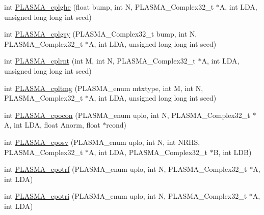 \begin{DoxyCompactItemize}
\item 
int \hyperlink{group__PLASMA__Complex32__t_gab2e8cb228186ddf8555009ee5b678b1c_gab2e8cb228186ddf8555009ee5b678b1c}{P\+L\+A\+S\+M\+A\+\_\+cplghe} (float bump, int N, P\+L\+A\+S\+M\+A\+\_\+\+Complex32\+\_\+t $\ast$A, int L\+D\+A, unsigned long long int seed)
\item 
int \hyperlink{group__PLASMA__Complex32__t_ga3fc244eb71f8484ede01d0a8fb8b7243_ga3fc244eb71f8484ede01d0a8fb8b7243}{P\+L\+A\+S\+M\+A\+\_\+cplgsy} (P\+L\+A\+S\+M\+A\+\_\+\+Complex32\+\_\+t bump, int N, P\+L\+A\+S\+M\+A\+\_\+\+Complex32\+\_\+t $\ast$A, int L\+D\+A, unsigned long long int seed)
\item 
int \hyperlink{group__PLASMA__Complex32__t_gadc1ab86fbc4e1acd67411bcf7d18ccc1_gadc1ab86fbc4e1acd67411bcf7d18ccc1}{P\+L\+A\+S\+M\+A\+\_\+cplrnt} (int M, int N, P\+L\+A\+S\+M\+A\+\_\+\+Complex32\+\_\+t $\ast$A, int L\+D\+A, unsigned long long int seed)
\item 
int \hyperlink{group__PLASMA__Complex32__t_gae69ed47baf0586751c50c701b1bba434_gae69ed47baf0586751c50c701b1bba434}{P\+L\+A\+S\+M\+A\+\_\+cpltmg} (P\+L\+A\+S\+M\+A\+\_\+enum mtxtype, int M, int N, P\+L\+A\+S\+M\+A\+\_\+\+Complex32\+\_\+t $\ast$A, int L\+D\+A, unsigned long long int seed)
\item 
int \hyperlink{group__PLASMA__Complex32__t_ga49718ad20a5a6701a7f3f91dc64173ba_ga49718ad20a5a6701a7f3f91dc64173ba}{P\+L\+A\+S\+M\+A\+\_\+cpocon} (P\+L\+A\+S\+M\+A\+\_\+enum uplo, int N, P\+L\+A\+S\+M\+A\+\_\+\+Complex32\+\_\+t $\ast$A, int L\+D\+A, float Anorm, float $\ast$rcond)
\item 
int \hyperlink{group__PLASMA__Complex32__t_gacb9e52ca26891e283878a10c6b7f24b7_gacb9e52ca26891e283878a10c6b7f24b7}{P\+L\+A\+S\+M\+A\+\_\+cposv} (P\+L\+A\+S\+M\+A\+\_\+enum uplo, int N, int N\+R\+H\+S, P\+L\+A\+S\+M\+A\+\_\+\+Complex32\+\_\+t $\ast$A, int L\+D\+A, P\+L\+A\+S\+M\+A\+\_\+\+Complex32\+\_\+t $\ast$B, int L\+D\+B)
\item 
int \hyperlink{group__PLASMA__Complex32__t_ga9a02052646386252f5b41c09c8d18684_ga9a02052646386252f5b41c09c8d18684}{P\+L\+A\+S\+M\+A\+\_\+cpotrf} (P\+L\+A\+S\+M\+A\+\_\+enum uplo, int N, P\+L\+A\+S\+M\+A\+\_\+\+Complex32\+\_\+t $\ast$A, int L\+D\+A)
\item 
int \hyperlink{group__PLASMA__Complex32__t_ga2bbe242c5e06f243640fb6287b4a85ab_ga2bbe242c5e06f243640fb6287b4a85ab}{P\+L\+A\+S\+M\+A\+\_\+cpotri} (P\+L\+A\+S\+M\+A\+\_\+enum uplo, int N, P\+L\+A\+S\+M\+A\+\_\+\+Complex32\+\_\+t $\ast$A, int L\+D\+A)
\item 

\end{DoxyCompactItemize}
